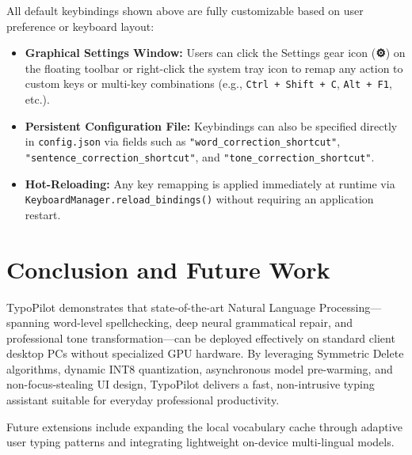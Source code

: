 \documentclass[11pt,a4paper]{article}
\begin{document}
\begin{tcolorbox}[colback=teal!4!white,colframe=teal!60!black,arc=2mm,title=\textbf{Custom Hotkey Configuration \& Flexibility}]
All default keybindings shown above are fully customizable based on user preference or keyboard layout:
\begin{itemize}[noitemsep,topsep=2pt]
    \item \textbf{Graphical Settings Window:} Users can click the Settings gear icon (\textbf{⚙}) on the floating toolbar or right-click the system tray icon to remap any action to custom keys or multi-key combinations (e.g., \texttt{Ctrl + Shift + C}, \texttt{Alt + F1}, etc.).
    \item \textbf{Persistent Configuration File:} Keybindings can also be specified directly in \texttt{config.json} via fields such as \texttt{"word\_correction\_shortcut"}, \texttt{"sentence\_correction\_shortcut"}, and \texttt{"tone\_correction\_shortcut"}.
    \item \textbf{Hot-Reloading:} Any key remapping is applied immediately at runtime via \texttt{KeyboardManager.reload\_bindings()} without requiring an application restart.
\end{itemize}
\end{tcolorbox}

\section{Conclusion and Future Work}
TypoPilot demonstrates that state-of-the-art Natural Language Processing---spanning word-level spellchecking, deep neural grammatical repair, and professional tone transformation---can be deployed effectively on standard client desktop PCs without specialized GPU hardware. By leveraging Symmetric Delete algorithms, dynamic INT8 quantization, asynchronous model pre-warming, and non-focus-stealing UI design, TypoPilot delivers a fast, non-intrusive typing assistant suitable for everyday professional productivity.

Future extensions include expanding the local vocabulary cache through adaptive user typing patterns and integrating lightweight on-device multi-lingual models.

\end{document}
